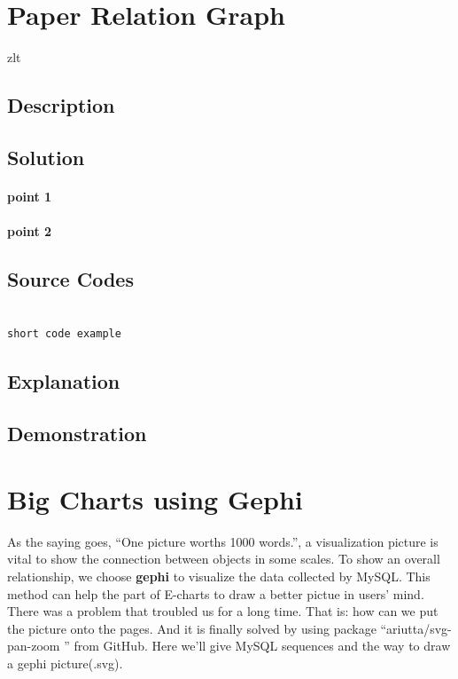 \documentclass{book}
\begin{document}
\section {Paper Relation Graph}

zlt

\subsection{Description}

\subsection{Solution}

\paragraph{point 1}

\paragraph{point 2}

\subsection{Source Codes}

\begin{minipage}[r]{15em}
\begin{verbatim}

short code example

\end{verbatim}
\end{minipage}

\subsection{Explanation}

\subsection{Demonstration}


\section{Big Charts using Gephi}

As the saying goes, ``One picture worths 1000 words.'', a visualization picture is vital to show the connection between objects in some scales. To show an overall relationship, we choose  \textbf{gephi} to visualize the data collected by MySQL. This method can help the part of E-charts to draw a better pictue in users' mind. 
There was a problem that troubled us for a long time. That is: how can we put the picture onto the pages. And it is finally solved by using package ``ariutta/svg-pan-zoom
'' from GitHub. 
Here we'll give MySQL sequences and the way to draw a gephi picture(.svg).
\end{document}

